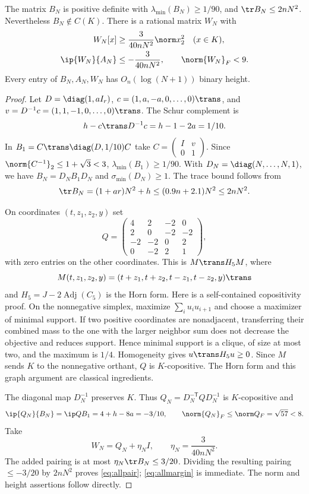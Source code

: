 \begin{lemma}\label{lem:allsep}
The matrix $B_N$ is positive definite with $\lambda_{\min}(B_N)\ge1/90$, and $\tr B_N\le2nN^2$. Nevertheless $B_N\notin C(K)$. There is a rational matrix $W_N$ with
\begin{align}
 W_N[x]&\ge\frac{3}{40nN^2}\norm x_2^2\quad(x\in K),\label{eq:allmargin}\\
 \ip{W_N}{A_N}&\le-\frac{3}{40nN^2},\qquad \norm{W_N}_F<9.\label{eq:allpair}
\end{align}
Every entry of $B_N,A_N,W_N$ has $O_n(\log(N+1))$ binary height.
\end{lemma}
\begin{proof}
Let $D=\diag(1,aI_r)$, $c=(1,a,-a,0,\ldots,0)\trans$, and $v=D^{-1}c=(1,1,-1,0,\ldots,0)\trans$. The Schur complement is
\[
 h-c\trans D^{-1}c=h-1-2a=1/10.
\]
In $B_1=C\trans\diag(D,1/10)C$ take $C=\left(\begin{smallmatrix}I&v\\0&1\end{smallmatrix}\right)$. Since $\norm{C^{-1}}_2\le1+\sqrt3<3$, $\lambda_{\min}(B_1)\ge1/90$. With $D_N=\diag(N,\ldots,N,1)$, we have $B_N=D_NB_1D_N$ and $\sigma_{\min}(D_N)\ge1$. The trace bound follows from
\[
 \tr B_N=(1+ar)N^2+h\le(0.9n+2.1)N^2\le2nN^2.
\]

On coordinates $(t,z_1,z_2,y)$ set
\begin{equation}\label{eq:allQ}
 Q=\begin{pmatrix}4&2&-2&0\\2&0&-2&-2\\-2&-2&0&2\\0&-2&2&1\end{pmatrix},
\end{equation}
with zero entries on the other coordinates. This is $M\trans H_5M$, where
\[
 M(t,z_1,z_2,y)=(t+z_1,t+z_2,t-z_1,t-z_2,y)\trans
\]
and $H_5=J-2\operatorname{Adj}(C_5)$ is the Horn form. Here is a self-contained copositivity proof. On the nonnegative simplex, maximize $\sum_i u_iu_{i+1}$ and choose a maximizer of minimal support. If two positive coordinates are nonadjacent, transferring their combined mass to the one with the larger neighbor sum does not decrease the objective and reduces support. Hence minimal support is a clique, of size at most two, and the maximum is $1/4$. Homogeneity gives $u\trans H_5u\ge0$. Since $M$ sends $K$ to the nonnegative orthant, $Q$ is $K$-copositive. The Horn form and this graph argument are classical ingredients.

The diagonal map $D_N^{-1}$ preserves $K$. Thus $Q_N=D_N^{-\mathsf T}QD_N^{-1}$ is $K$-copositive and
\[
 \ip{Q_N}{B_N}=\ip Q{B_1}=4+h-8a=-3/10,
 \qquad\norm{Q_N}_F\le\norm Q_F=\sqrt{57}<8.
\]
Take
\begin{equation}\label{eq:allW}
 W_N=Q_N+\eta_N I,\qquad\eta_N=\frac{3}{40nN^2}.
\end{equation}
The added pairing is at most $\eta_N\tr B_N\le3/20$. Dividing the resulting pairing $\le-3/20$ by $2nN^2$ proves \eqref{eq:allpair}; \eqref{eq:allmargin} is immediate. The norm and height assertions follow directly.
\end{proof}

